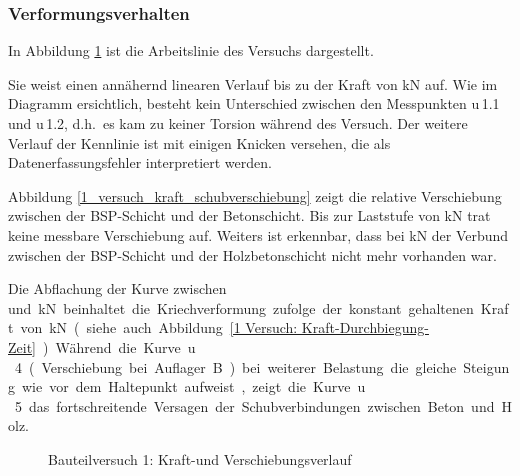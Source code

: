 \subsubsection{Verformungsverhalten}

In Abbildung \ref{1 Versuch: Kraft-Durchbiegung} ist die Arbeitslinie des Versuchs dargestellt.

Sie weist einen annähernd linearen Verlauf bis zu der Kraft von \unit[58]{kN} auf. Wie im Diagramm ersichtlich, besteht kein Unterschied zwischen den Messpunkten  u\,1.1 und u\,1.2, d.h.\ es kam zu keiner Torsion während des Versuch.
Der weitere Verlauf der Kennlinie ist mit einigen Knicken versehen, die als Datenerfassungsfehler interpretiert werden. 

Abbildung \ref{1_versuch_kraft_schubverschiebung} zeigt die relative Verschiebung zwischen der BSP-Schicht und der Betonschicht. Bis zur Laststufe von \unit[35]{kN} trat keine messbare Verschiebung auf. Weiters ist erkennbar, dass bei \unit[58]{kN} der Verbund zwischen der BSP-Schicht und der Holzbetonschicht nicht mehr vorhanden war. 

Die Abflachung der Kurve zwischen \unit[58] und \unit[60]{kN} beinhaltet die Kriechverformung zufolge der konstant gehaltenen Kraft von \unit[58]{kN}(siehe auch Abbildung \ref{1 Versuch: Kraft-Durchbiegung-Zeit}). Während die Kurve u\,4 (Verschiebung bei Auflager B) bei weiterer Belastung die gleiche Steigung wie vor dem Haltepunkt aufweist, zeigt die Kurve u\,5 das fortschreitende Versagen der Schubverbindungen zwischen Beton und Holz. 


\begin{figure}[h!]
\begin{center}
\caption{Bauteilversuch 1: Kraft-und Verschiebungsverlauf}
\label{1 Versuch: Kraft-Durchbiegung}
\end{center}
\end{figure}

